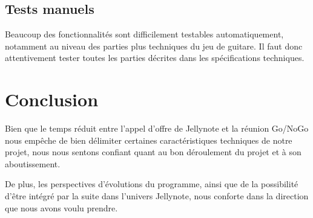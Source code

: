 \documentclass[12pt]{article}
\begin{document}
\subsection{Tests manuels}
Beaucoup des fonctionnalités sont difficilement testables automatiquement, notamment au niveau des parties plus techniques du jeu de guitare. Il faut donc attentivement tester toutes les parties décrites dans les spécifications techniques.\\

\newpage
\section{Conclusion}

\par Bien que le temps réduit entre l'appel d'offre de Jellynote et la réunion Go/NoGo nous empêche de bien délimiter certaines caractéristiques techniques de notre projet, nous nous sentons confiant quant au bon déroulement du projet et à son aboutissement.\\

\par De plus, les perspectives d'évolutions du programme, ainsi que de la possibilité d'être intégré par la suite dans l'univers Jellynote, nous conforte dans la direction que nous avons voulu prendre.
\end{document}
